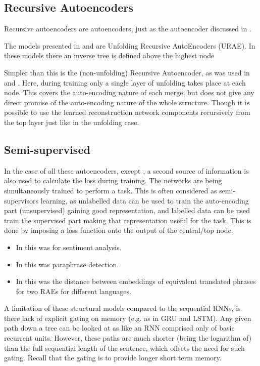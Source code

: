 \documentclass[12pt,parskip]{komatufte}
\begin{document}
\subsection{Recursive Autoencoders}
Recursive autoencoders are autoencoders, just as the autoencoder discussed in .


The models presented in \textcite{SocherEtAl2011:PoolRAE} and \textcite{iyyer2014generating}
are Unfolding Recursive AutoEncoders (URAE).
In these models there an inverse tree is defined above the highest node


Simpler than this is the (non-unfolding) Recursive Autoencoder,
as was used in \textcite{SocherEtAl2011:RAE} and \textcite{zhang2014BRAE}.
Here, during training only a single layer of unfolding takes place at each node.
This covers the auto-encoding nature of each merge;
but does not give any direct promise of the auto-encoding nature of the whole structure.
Though it is possible to use the learned reconstruction network components recursively from the top layer just like in the unfolding case.

\subsection{Semi-supervised}
In the case of all these autoencoders, except \textcite{iyyer2014generating}, a second source of information is also used to calculate the loss during training.
The networks are being simultaneously trained to perform a task.
This is often considered as semi-supervisors learning, as unlabelled data can be used to train the auto-encoding part (unsupervised) gaining good representation, and labelled data can be used train the supervised part making that representation useful for the task.
This is done by imposing a loss function onto the output of the central/top node.
\begin{itemize}
 \item In \textcite{SocherEtAl2011:RAE} this was for sentiment analysis.
 \item In \textcite{SocherEtAl2011:PoolRAE} this was paraphrase detection.
 \item In \textcite{zhang2014BRAE} this was the distance between embeddings of equivalent translated phrases for two RAEs for different languages.
\end{itemize}

 




A limitation of these structural models compared to the sequential RNNs,
is there lack of explicit gating on memory (e.g. as in GRU and LSTM).
Any given path down a tree can be looked at as like an RNN comprised only of basic recurrent units.
However, these paths are much shorter (being the logarithm of) than the full sequential length of the sentence,
which offsets the need for such gating.
Recall that the gating is to provide longer short term memory.
\end{document}
